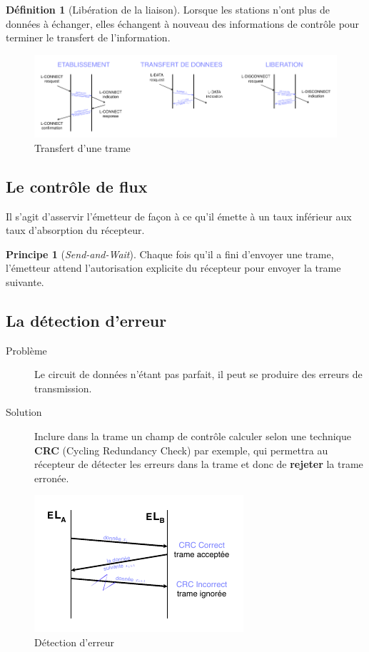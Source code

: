 \documentclass[11pt,english,french]{scrreprt}
\theoremstyle{remark}
\theoremstyle{definition}
\newtheorem*{def*}{Définition}
\newtheorem*{princ*}{Principe}
\begin{document}
\begin{def*}[Libération de la liaison]
	Lorsque les stations n'ont plus de données à échanger, elles échangent à nouveau des informations de contrôle pour terminer le transfert de l'information.
\end{def*}

\begin{figure}[h!]
	\center
	\includegraphics[scale=1.2]{graphes/transfert_data}
	\caption{Transfert d'une trame}
\end{figure}

\subsection*{Le contrôle de flux} %
Il s'agit d'asservir l'émetteur de façon à ce qu'il émette à un taux inférieur aux taux d'absorption du récepteur.

\begin{princ*}[\emph{Send-and-Wait}]
	Chaque fois qu'il a fini d'envoyer une trame, l'émetteur attend l'autorisation explicite du récepteur pour envoyer la trame suivante.
\end{princ*} 

\subsection*{La détection d'erreur} %

\begin{description}
	\item[Problème] Le circuit de données n'étant pas parfait, il peut se produire des erreurs de transmission.
	\item[Solution] Inclure dans la trame un champ de contrôle calculer selon une technique \textbf{CRC} (Cycling Redundancy Check) par exemple, qui permettra au récepteur de détecter les erreurs dans la trame et donc de \textbf{rejeter} la trame erronée.
\end{description}

\begin{figure}[h!]
	\center
	\includegraphics[scale=1.2]{graphes/erreur_transmission}
	\caption{Détection d'erreur}
\end{figure}
\end{document}
